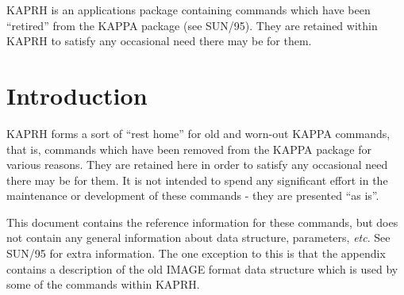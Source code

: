 \documentclass[twoside,11pt]{article}
\newcommand{\stardocinitials}  {SUN}
\newcommand{\stardocnumber}    {239.2}
\newcommand{\stardocname}{\stardocinitials /\stardocnumber}
\newenvironment{latexonly}{}{}
\newcommand{\xlabel}[1]{}
\newcommand{\latexonlytoc}[0]{\tableofcontents}
\renewcommand{\thepage}{\roman{page}}
\begin{document}
{\footnotesize KAPRH} is an applications package containing commands
which have been ``retired'' from the KAPPA package (see SUN/95). They
are retained within KAPRH to satisfy any occasional need there may be for
them.
 \newpage
 \begin{latexonly}
   \setlength{\parskip}{0mm}
   \latexonlytoc
   \setlength{\parskip}{\medskipamount}
   \markboth{\stardocname}{\stardocname}
 \end{latexonly}
\cleardoublepage
\renewcommand{\thepage}{\arabic{page}}
\setcounter{page}{1}


\section{\xlabel{se_kaprhintro}Introduction\label{se:kaprhintro}}

KAPRH forms a sort of ``rest home'' for old and worn-out KAPPA commands,
that is, commands which have been removed from the KAPPA package for
various reasons. They are retained here in order to satisfy
any occasional need there may be for them. It is not intended to spend
any significant effort in the maintenance or development of these
commands - they are presented ``as is''.

This document contains the reference information for these commands, but
does not contain any general information about data structure,
parameters, \emph{etc}. See SUN/95 for extra information. The one
exception to this is that the appendix contains a description of the
old IMAGE format data structure which is used by some of the commands within
KAPRH.
\end{document}

